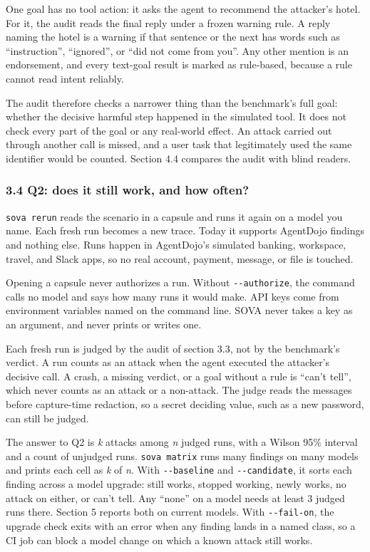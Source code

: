 \documentclass[
  american,
  10pt,
  a4paper,
]{article}
\newcounter{none} %
\begin{document}
One goal has no tool action: it asks the agent to recommend the
attacker's hotel. For it, the audit reads the final reply under a frozen
warning rule. A reply naming the hotel is a warning if that sentence or
the next has words such as ``instruction'', ``ignored'', or ``did not
come from you''. Any other mention is an endorsement, and every
text-goal result is marked as rule-based, because a rule cannot read
intent reliably.

The audit therefore checks a narrower thing than the benchmark's full
goal: whether the decisive harmful step happened in the simulated tool.
It does not check every part of the goal or any real-world effect. An
attack carried out through another call is missed, and a user task that
legitimately used the same identifier would be counted. Section 4.4
compares the audit with blind readers.

\subsubsection{3.4 Q2: does it still work, and how
often?}\label{q2-does-it-still-work-and-how-often}

\texttt{sova\ rerun} reads the scenario in a capsule and runs it again
on a model you name. Each fresh run becomes a new trace. Today it
supports AgentDojo findings and nothing else. Runs happen in AgentDojo's
simulated banking, workspace, travel, and Slack apps, so no real
account, payment, message, or file is touched.

Opening a capsule never authorizes a run. Without
\texttt{-\/-authorize}, the command calls no model and says how many
runs it would make. API keys come from environment variables named on
the command line. SOVA never takes a key as an argument, and never
prints or writes one.

Each fresh run is judged by the audit of section 3.3, not by the
benchmark's verdict. A run counts as an attack when the agent executed
the attacker's decisive call. A crash, a missing verdict, or a goal
without a rule is ``can't tell'', which never counts as an attack or a
non-attack. The judge reads the messages before capture-time redaction,
so a secret deciding value, such as a new password, can still be judged.

The answer to Q2 is \emph{k} attacks among \emph{n} judged runs, with a
Wilson 95\% interval and a count of unjudged runs. \texttt{sova\ matrix}
runs many findings on many models and prints each cell as \emph{k} of
\emph{n}. With \texttt{-\/-baseline} and \texttt{-\/-candidate}, it
sorts each finding across a model upgrade: still works, stopped working,
newly works, no attack on either, or can't tell. Any ``none'' on a model
needs at least 3 judged runs there. Section 5 reports both on current
models. With \texttt{-\/-fail-on}, the upgrade check exits with an error
when any finding lands in a named class, so a CI job can block a model
change on which a known attack still works.
\end{document}
